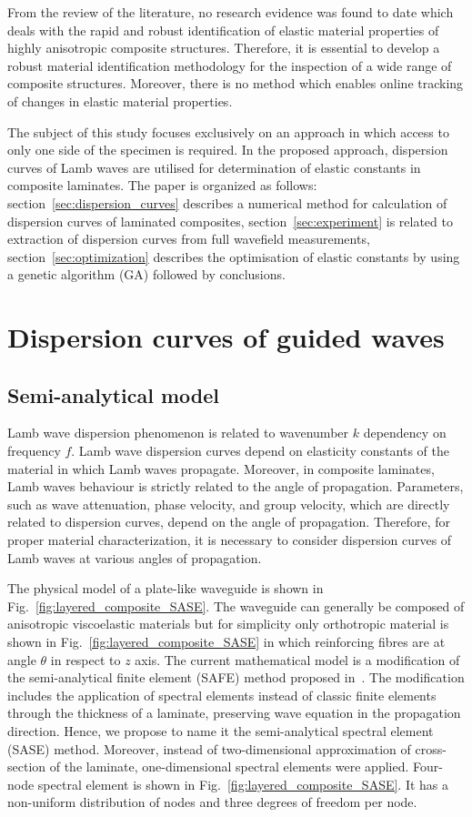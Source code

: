 \documentclass[preprint,12pt]{elsarticle}
\begin{document}
	From the review of the literature, no research evidence was found to date which deals with the rapid and robust identification of elastic material properties of highly anisotropic composite structures. Therefore, it is essential to develop a robust material identification methodology for the inspection of a wide range of composite structures. Moreover, there is no method which enables online tracking of changes in elastic material properties.
	
	The subject of this study focuses exclusively on an approach in which access to only one side of the specimen is required. In the proposed approach, dispersion curves of Lamb waves are utilised for determination of elastic constants in composite laminates. The paper is organized as follows: section~\ref{sec:dispersion_curves} describes a numerical method for calculation of dispersion curves of laminated composites, section~\ref{sec:experiment} is related to extraction of dispersion curves from full wavefield measurements, section~\ref{sec:optimization} describes the optimisation of elastic constants by using a genetic algorithm (GA) followed by conclusions.
	
	
	\section{Dispersion curves of guided waves \label{sec:dispersion_curves}}
	\subsection{Semi-analytical model}
	Lamb wave dispersion phenomenon is related to wavenumber  $k$ dependency on frequency $f$. Lamb wave dispersion curves depend on elasticity constants of the material in which Lamb waves propagate. Moreover, in composite laminates, Lamb waves behaviour is strictly related to the angle of propagation. Parameters, such as wave attenuation, phase velocity, and group velocity, which are directly related to dispersion curves, depend on the angle of propagation. Therefore, for proper material characterization, it is necessary to consider dispersion curves of Lamb waves at various angles of propagation.
	
	The physical model of a plate-like waveguide is shown in Fig.~\ref{fig:layered_composite_SASE}.  The waveguide can generally be composed of anisotropic viscoelastic materials but for simplicity only orthotropic material is shown in Fig.~\ref{fig:layered_composite_SASE} in which reinforcing fibres are at angle $\theta$ in respect to $z$ axis. The current mathematical model is a modification of the semi-analytical finite element (SAFE) method proposed in~\cite{Bartoli2006}. The modification includes the application of spectral elements instead of classic finite elements through the thickness of a laminate, preserving wave equation in the propagation direction. Hence, we propose to name it the semi-analytical spectral element (SASE) method. Moreover, instead of two-dimensional approximation of cross-section of the laminate, one-dimensional spectral elements were applied. Four-node spectral element is shown in Fig.~\ref{fig:layered_composite_SASE}. It has a non-uniform distribution of nodes and three degrees of freedom per node.
	
\end{document}
